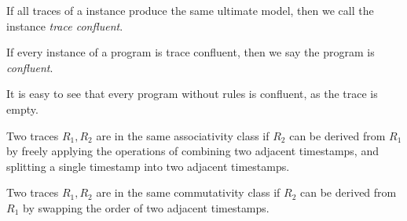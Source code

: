 %


\begin{definition}
%
If all traces of a \lang instance produce the same ultimate model, then we call
the instance {\em trace confluent}.
%
\end{definition}

\begin{definition}
%
If every instance of a program is trace confluent, then we say the program is
{\em confluent}.
%
\end{definition}

\noindent{}It is easy to see that every \lang program without 
rules is confluent, as the trace is empty.

\begin{definition}
%
Two traces $R_1, R_2$ are in the same associativity class if $R_2$ can be
derived from $R_1$ by freely applying the operations of combining two adjacent
timestamps, and splitting a single timestamp into two adjacent timestamps.
%
\end{definition}

\begin{definition}
%
Two traces $R_1, R_2$ are in the same commutativity class if $R_2$ can be
derived from $R_1$ by swapping the order of two adjacent timestamps.
%
\end{definition}

